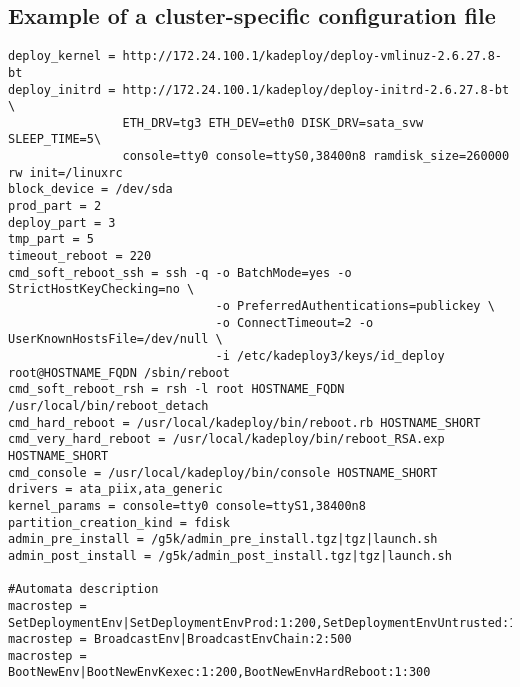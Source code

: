 \documentclass[a4wide,10pt,oneside]{book}
\begin{document}
\subsection{Example of a cluster-specific configuration file}
\begin{small}
\begin{verbatim}
deploy_kernel = http://172.24.100.1/kadeploy/deploy-vmlinuz-2.6.27.8-bt
deploy_initrd = http://172.24.100.1/kadeploy/deploy-initrd-2.6.27.8-bt \
                ETH_DRV=tg3 ETH_DEV=eth0 DISK_DRV=sata_svw SLEEP_TIME=5\
                console=tty0 console=ttyS0,38400n8 ramdisk_size=260000 rw init=/linuxrc
block_device = /dev/sda
prod_part = 2
deploy_part = 3
tmp_part = 5
timeout_reboot = 220
cmd_soft_reboot_ssh = ssh -q -o BatchMode=yes -o StrictHostKeyChecking=no \
                             -o PreferredAuthentications=publickey \
                             -o ConnectTimeout=2 -o UserKnownHostsFile=/dev/null \
                             -i /etc/kadeploy3/keys/id_deploy root@HOSTNAME_FQDN /sbin/reboot
cmd_soft_reboot_rsh = rsh -l root HOSTNAME_FQDN /usr/local/bin/reboot_detach
cmd_hard_reboot = /usr/local/kadeploy/bin/reboot.rb HOSTNAME_SHORT
cmd_very_hard_reboot = /usr/local/kadeploy/bin/reboot_RSA.exp HOSTNAME_SHORT
cmd_console = /usr/local/kadeploy/bin/console HOSTNAME_SHORT
drivers = ata_piix,ata_generic
kernel_params = console=tty0 console=ttyS1,38400n8
partition_creation_kind = fdisk
admin_pre_install = /g5k/admin_pre_install.tgz|tgz|launch.sh
admin_post_install = /g5k/admin_post_install.tgz|tgz|launch.sh

#Automata description
macrostep = SetDeploymentEnv|SetDeploymentEnvProd:1:200,SetDeploymentEnvUntrusted:1:400
macrostep = BroadcastEnv|BroadcastEnvChain:2:500
macrostep = BootNewEnv|BootNewEnvKexec:1:200,BootNewEnvHardReboot:1:300
\end{verbatim}
\end{small}
\end{document}
